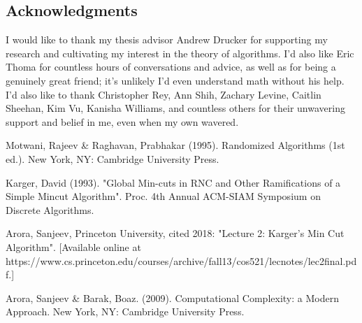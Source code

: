 \documentclass[psamsfonts, 10pt]{amsart}
\theoremstyle{definition}
\theoremstyle{remark}
\numberwithin{equation}{section}
\begin{document}
\subsection*{Acknowledgments} I would like to thank my thesis advisor Andrew Drucker for supporting my research and cultivating my interest in the theory of algorithms.  I'd also like Eric Thoma for countless hours of conversations and advice, as well as for being a genuinely great friend; it's unlikely I'd even understand math without his help. I'd also like to thank Christopher Rey, Ann Shih, Zachary Levine, Caitlin Sheehan, Kim Vu, Kanisha Williams, and countless others for their unwavering support and belief in me, even when my own wavered.
\begin{thebibliography}{9}

Motwani, Rajeev \& Raghavan, Prabhakar (1995). Randomized Algorithms (1st ed.). New York, NY: Cambridge University Press.

Karger, David (1993). "Global Min-cuts in RNC and Other Ramifications of a Simple Mincut Algorithm". Proc. 4th Annual ACM-SIAM Symposium on Discrete Algorithms.

 Arora, Sanjeev, Princeton University, cited 2018: "Lecture 2: Karger's Min Cut Algorithm".
[Available online at https://www.cs.princeton.edu/courses/archive/fall13/cos521/lecnotes/lec2final.pdf.] 

 Arora, Sanjeev \& Barak, Boaz. (2009). Computational Complexity: a Modern Approach. New York, NY: Cambridge University Press.

\end{thebibliography}
\end{document}
